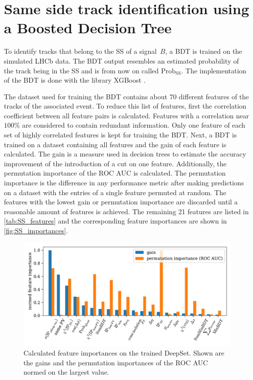 \section{Same side track identification using a Boosted Decision Tree}
\label{sec:SS_classifier}

To identify tracks that belong to the SS of a signal~$B$, a BDT is trained on the simulated LHCb data. 
The BDT output resembles an estimated probability of the track being in the SS and is from now on called $\text{Prob}_\text{SS}$.
The implementation of the BDT is done with the library XGBoost \cite{xgboost}.

The dataset used for training the BDT contains about 70 different features of the tracks of the associated event.
To reduce this list of features, first the correlation coefficient between all feature pairs is calculated.
Features with a correlation near $100\%$ are considered to contain redundant information. %
Only one feature of each set of highly correlated features is kept for training the BDT.
Next, a BDT is trained on a dataset containing all features and the gain of each feature is calculated.
The gain is a measure used in decision trees to estimate the accuracy improvement of the introduction of a cut on one feature.
Additionally, the permutation importance of the ROC AUC is calculated.
The permutation importance is the difference in any performance metric after making predictions on a dataset with the entries of a single feature permuted at random.
The features with the lowest gain or permutation importance are discarded until a reasonable amount of features is achieved.
The remaining 21 features are listed in \autoref{tab:SS_features} and the corresponding feature importances are shown in \autoref{fig:SS_importances}.

\begin{figure}
    \centering
    \includegraphics[width=\textwidth]{images/SS_feature_importances.pdf}
    \caption{Calculated feature importances on the trained DeepSet. Shown are the gains and the permutation importances of the ROC AUC normed on the largest value.}
    \label{fig:SS_importances}
\end{figure}

